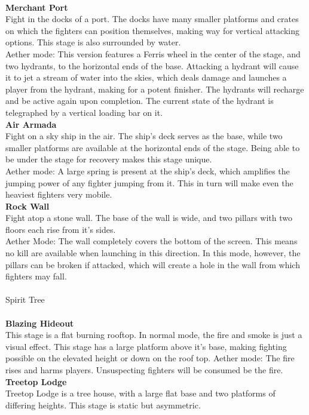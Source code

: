 \documentclass{article}
\begin{document}
\\
\textbf{Merchant Port}\\
Fight in the docks of a port. The docks have many smaller platforms and crates on which the fighters can position themselves, making way for vertical attacking options. This stage is also surrounded by water.\\
Aether mode: This version features a Ferris wheel in the center of the stage, and two hydrants, to the horizontal ends of the base. Attacking a hydrant will cause it to jet a stream of water into the skies, which deals damage and launches a player from the hydrant, making for a potent finisher. The hydrants will recharge and be active again upon completion. The current state of the hydrant is telegraphed by a vertical loading bar on it.
\\
\textbf{Air Armada}\\
Fight on a sky ship in the air. The ship's deck serves as the base, while two smaller platforms are available at the horizontal ends of the stage. Being able to be under the stage for recovery makes this stage unique.\\
Aether mode: A large spring is present at the ship's deck, which amplifies the jumping power of any fighter jumping from it. This in turn will make even the heaviest fighters very mobile.
\\
\textbf{Rock Wall}\\
Fight atop a stone wall. The base of the wall is wide, and two pillars with two floors each rise from it's sides.\\
Aether Mode: The wall completely covers the bottom of the screen. This means no kill are available when launching in this direction. In this mode, however, the pillars can be broken if attacked, which will create a hole in the wall from which fighters may fall.\\
\\
Spirit Tree\\%
\\
\textbf{Blazing Hideout}\\
This stage is a flat burning rooftop. In normal mode, the fire and smoke is just a visual effect. This stage has a large platform above it's base, making fighting possible on the elevated height or down on the roof top.
Aether mode: The fire rises and harms players. Unsuspecting fighters will be consumed be the fire.
\\
\textbf{Treetop Lodge}\\
Treetop Lodge is a tree house, with a large flat base and two platforms of differing heights. This stage is static but asymmetric.
\end{document}
